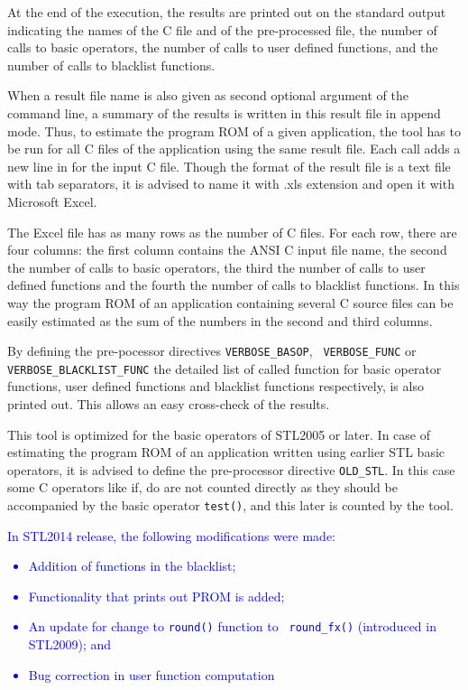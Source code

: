 At the end of the execution, the results are printed out on the
standard output indicating the names of the C file and of the
pre-processed file, the number of calls to basic operators, the number
of calls to user defined functions, and the number of calls to
blacklist functions.

When a result file name is also given as second optional argument of
the command line, a summary of the results is written in this result
file in append mode. Thus, to estimate the program ROM of a given
application, the tool has to be run for all C files of the application
using the same result file. Each call adds a new line in for the input
C file. Though the format of the result file is a text file with tab
separators, it is advised to name it with .xls extension and open it
with Microsoft Excel.

The Excel file has as many rows as the number of C files. For each
row, there are four columns: the first column contains the ANSI C
input file name, the second the number of calls to basic operators,
the third the number of calls to user defined functions and the fourth
the number of calls to blacklist functions. In this way the program
ROM of an application containing several C source files can be easily
estimated as the sum of the numbers in the second and third columns.

By defining the pre-pocessor directives {\tt VERBOSE\_BASOP}, {\tt
VERBOSE\_FUNC} or\\ {\tt VERBOSE\_BLACKLIST\_FUNC} the detailed list
of called function for basic operator functions, user defined
functions and blacklist functions respectively, is also printed
out. This allows an easy cross-check of the results.

This tool is optimized for the basic operators of STL2005 or later. In
case of estimating the program ROM of an application written using
earlier STL basic operators, it is advised to define the pre-processor
directive {\tt OLD\_STL}. In this case some C operators like if, do
are not counted directly as they should be accompanied by the basic
operator {\tt test()}, and this later is counted by the tool.

\textcolor{blue}{
%
  In STL2014 release, the following modifications were made:
\begin{itemize}
\item Addition of functions in the blacklist;
\item Functionality that prints out PROM is added;
\item An update for change to {\tt round()} function to {\tt
    round\_fx()} (introduced in STL2009); and
\item Bug correction in user function computation
\end{itemize}
%
}


